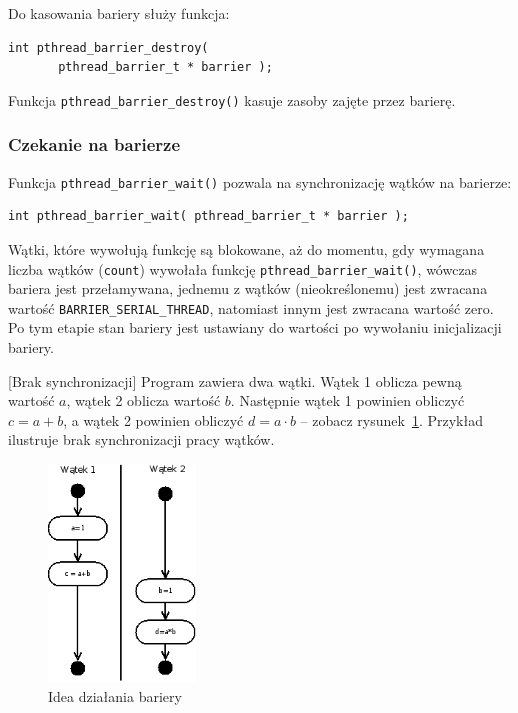 Do kasowania bariery służy funkcja:

\begin{lstlisting}[style=MyCStyle]
int pthread_barrier_destroy(
       pthread_barrier_t * barrier );
\end{lstlisting}

Funkcja \lstinline[style=MyCStyle]{pthread_barrier_destroy()} kasuje zasoby zajęte przez barierę.

\subsubsection{Czekanie na barierze}

Funkcja  \lstinline[style=MyCStyle]{pthread_barrier_wait()} pozwala na synchronizację wątków na barierze:

\begin{lstlisting}[style=MyCStyle]
	int pthread_barrier_wait( pthread_barrier_t * barrier );
\end{lstlisting}

Wątki, które wywołują funkcję są blokowane, aż do momentu, gdy wymagana liczba wątków (\lstinline[style=MyCStyle]{count}) wywołała funkcję \lstinline[style=MyCStyle]{pthread_barrier_wait()}, wówczas bariera jest przełamywana, jednemu z wątków (nieokreślonemu) jest zwracana wartość \lstinline[style=MyCStyle]{BARRIER_SERIAL_THREAD}, natomiast innym jest zwracana wartość zero. Po tym etapie stan bariery jest ustawiany do wartości po wywołaniu inicjalizacji bariery.

\begin{example}{[Brak synchronizacji]}
Program zawiera dwa wątki. Wątek 1 oblicza pewną wartość $a$, wątek 2 oblicza wartość $b$. Następnie wątek 1 powinien obliczyć $c=a+b$, a wątek 2 powinien obliczyć $d=a\cdot b$ -- zobacz rysunek~\ref{fig:thrd_async_example}. Przykład ilustruje brak synchronizacji pracy wątków.

\begin{figure}[!h]
\centering
\includegraphics[width=0.35\textwidth]{img/thrd_async_example}
\caption{Idea działania bariery}
\label{fig:thrd_async_example}
\end{figure}


\end{example}

